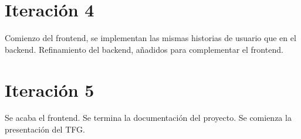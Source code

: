 \section{Iteración 4}

Comienzo del frontend, se implementan las mismas historias de usuario que en el backend.
Refinamiento del backend, añadidos para complementar el frontend.

\section{Iteración 5}

Se acaba el frontend. Se termina la documentación del proyecto.
Se comienza la presentación del TFG.


